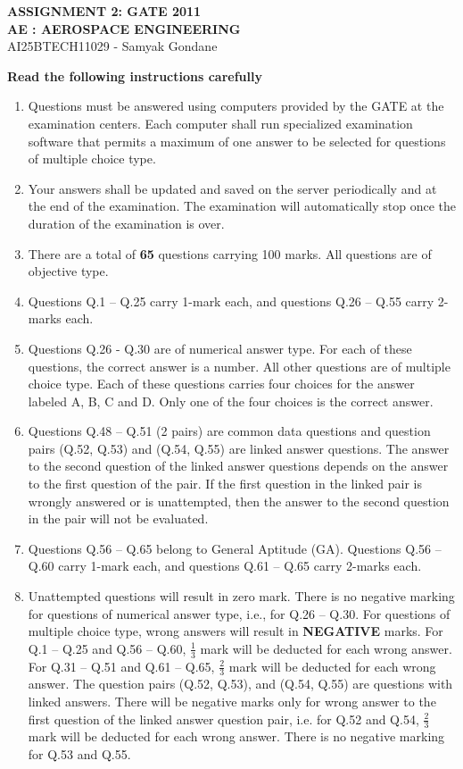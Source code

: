 \documentclass{article}
\begin{document}
\begin{center}
\large
    \textbf{ASSIGNMENT 2: GATE 2011 \\ AE : AEROSPACE ENGINEERING}\\
    AI25BTECH11029 - Samyak Gondane
\end{center}



\textbf{Read the following instructions carefully}

\begin{enumerate}
    \item Questions must be answered using computers provided by the GATE at the examination centers. Each computer shall run specialized examination software that permits a maximum of one answer to be selected for questions of multiple choice type.    
    \item Your answers shall be updated and saved on the server periodically and at the end of the examination. The examination will automatically stop once the duration of the examination is over.
    \item There are a total of \textbf{65} questions carrying 100 marks. All questions are of objective type.    
    \item Questions Q.1 – Q.25 carry 1-mark each, and questions Q.26 – Q.55 carry 2-marks each.    
    \item Questions Q.26 - Q.30 are of numerical answer type. For each of these questions, the correct answer is a number. All other questions are of multiple choice type. Each of these questions carries four choices for the answer labeled A, B, C and D. Only one of the four choices is the correct answer.    
    \item Questions Q.48 – Q.51 (2 pairs) are common data questions and question pairs (Q.52, Q.53) and (Q.54, Q.55) are linked answer questions. The answer to the second question of the linked answer questions depends on the answer to the first question of the pair. If the first question in the linked pair is wrongly answered or is unattempted, then the answer to the second question in the pair will not be evaluated.    
    \item Questions Q.56 – Q.65 belong to General Aptitude (GA). Questions Q.56 – Q.60 carry 1-mark each, and questions Q.61 – Q.65 carry 2-marks each.    
    \item Unattempted questions will result in zero mark. There is no negative marking for questions of numerical answer type, i.e., for Q.26 – Q.30. For questions of multiple choice type, wrong answers will result in \textbf{NEGATIVE} marks. For Q.1 – Q.25 and Q.56 – Q.60, $\frac{1}{3}$ mark will be deducted for each wrong answer. For Q.31 – Q.51 and Q.61 – Q.65, $\frac{2}{3}$ mark will be deducted for each wrong answer. The question pairs (Q.52, Q.53), and (Q.54, Q.55) are questions with linked answers. There will be negative marks only for wrong answer to the first question of the linked answer question pair, i.e. for Q.52 and Q.54, $\frac{2}{3}$ mark will be deducted for each wrong answer. There is no negative marking for Q.53 and Q.55.    

\end{enumerate}
\end{document}

